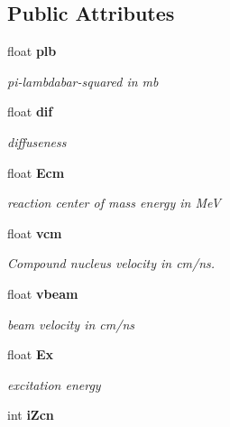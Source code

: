 \subsection*{Public Attributes}
\begin{CompactItemize}
\item 
float \bf{plb}\label{classCFus_d3ad1a11415b19bf5cf82d795287e7f0}

\begin{CompactList}\small\item\em pi-lambdabar-squared in mb \item\end{CompactList}\item 
float \bf{dif}\label{classCFus_f3bad4a0a91c10aa302da844d9d63fc0}

\begin{CompactList}\small\item\em diffuseness \item\end{CompactList}\item 
float \bf{Ecm}\label{classCFus_1d772db1e6fb36be44d880d131263949}

\begin{CompactList}\small\item\em reaction center of mass energy in Me\-V \item\end{CompactList}\item 
float \bf{vcm}\label{classCFus_fe1a337a3ba1218806c832a58ef0da56}

\begin{CompactList}\small\item\em Compound nucleus velocity in cm/ns. \item\end{CompactList}\item 
float \bf{vbeam}\label{classCFus_47c14cbfb1017f37288907ebe9efaf63}

\begin{CompactList}\small\item\em beam velocity in cm/ns \item\end{CompactList}\item 
float \bf{Ex}\label{classCFus_f596d04b58e81431404961bd71672942}

\begin{CompactList}\small\item\em excitation energy \item\end{CompactList}\item 
int \bf{i\-Zcn}\label{classCFus_a87046723aa4acf688cd2ba1e47fe399}


\end{CompactItemize}
